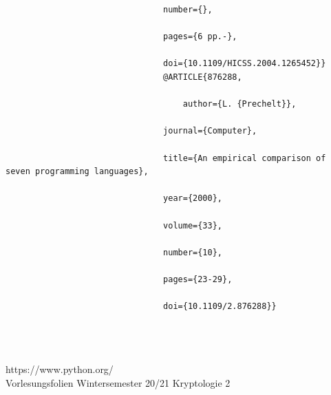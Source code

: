 \documentclass[a4paper,12pt]{scrartcl}
\begin{document}
\begin{verbatim}
								number={},
								
								pages={6 pp.-},
								
								doi={10.1109/HICSS.2004.1265452}}
								@ARTICLE{876288,
									
									author={L. {Prechelt}},
								
								journal={Computer}, 
								
								title={An empirical comparison of seven programming languages}, 
								
								year={2000},
								
								volume={33},
								
								number={10},
								
								pages={23-29},
								
								doi={10.1109/2.876288}}
								
								
								
\end{verbatim}

https://www.python.org/\\
Vorlesungsfolien Wintersemester 20/21 Kryptologie 2
\end{document}
